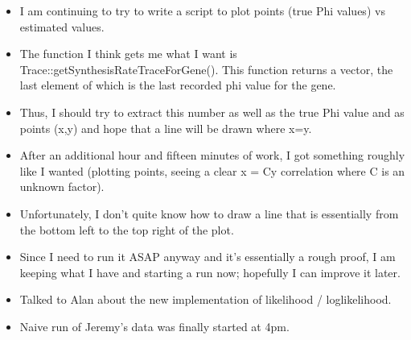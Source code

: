 \documentclass[12pt,hyperref]{labbook}
\newcommand{\sep}{\discretionary{}{}{}} %
\begin{document}

\begin{itemize}
    \item I am continuing to try to write a script to plot points (true Phi values) vs estimated values.
    \item The function I think gets me what I want is Trace\sep ::\sep get\sep Synthesis\sep Rate\sep Trace\sep For\sep Gene\sep ().
    This function returns a vector, the last element of which is the last recorded phi value for the gene.
    \item Thus, I should try to extract this number as well as the true Phi value and as points (x,y) and hope that a line will be drawn where x=y.
    \item After an additional hour and fifteen minutes of work, I got something roughly like I wanted (plotting points, seeing a clear x = Cy correlation where C is an unknown factor).
    \item Unfortunately, I don't quite know how to draw a line that is essentially from the bottom left to the top right of the plot.
    \item Since I need to run it ASAP anyway and it's essentially a rough proof, I am keeping what I have and starting a run now; hopefully I can improve it later.
    \item Talked to Alan about the new implementation of likelihood / loglikelihood.
    \item Naive run of Jeremy's data was finally started at 4pm.
\end{itemize}

\end{document}
